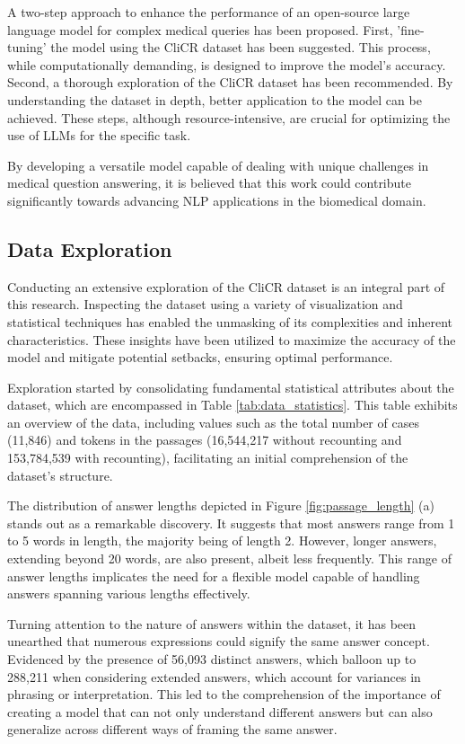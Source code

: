 \documentclass[onecolumn, conference]{IEEEtran}
\begin{document}
A two-step approach to enhance the performance of an open-source large language model for complex medical queries has been proposed. First, 'fine-tuning' the model using the CliCR dataset has been suggested. This process, while computationally demanding, is designed to improve the model's accuracy. Second, a thorough exploration of the CliCR dataset has been recommended. By understanding the dataset in depth, better application to the model can be achieved. These steps, although resource-intensive, are crucial for optimizing the use of LLMs for the specific task.

By developing a versatile model capable of dealing with unique challenges in medical question answering, it is believed that this work could contribute significantly towards advancing NLP applications in the biomedical domain.

\subsection{Data Exploration}

Conducting an extensive exploration of the CliCR dataset is an integral part of this research. Inspecting the dataset using a variety of visualization and statistical techniques has enabled the unmasking of its complexities and inherent characteristics. These insights have been utilized to maximize the accuracy of the model and mitigate potential setbacks, ensuring optimal performance.

Exploration started by consolidating fundamental statistical attributes about the dataset, which are encompassed in Table \ref{tab:data_statistics}. This table exhibits an overview of the data, including values such as the total number of cases (11,846) and tokens in the passages (16,544,217 without recounting and 153,784,539 with recounting), facilitating an initial comprehension of the dataset's structure.

The distribution of answer lengths depicted in Figure \ref{fig:passage_length} (a) stands out as a remarkable discovery. It suggests that most answers range from 1 to 5 words in length, the majority being of length 2. However, longer answers, extending beyond 20 words, are also present, albeit less frequently. This range of answer lengths implicates the need for a flexible model capable of handling answers spanning various lengths effectively.

Turning attention to the nature of answers within the dataset, it has been unearthed that numerous expressions could signify the same answer concept. Evidenced by the presence of 56,093 distinct answers, which balloon up to 288,211 when considering extended answers, which account for variances in phrasing or interpretation. This led to the comprehension of the importance of creating a model that can not only understand different answers but can also generalize across different ways of framing the same answer.
\end{document}
